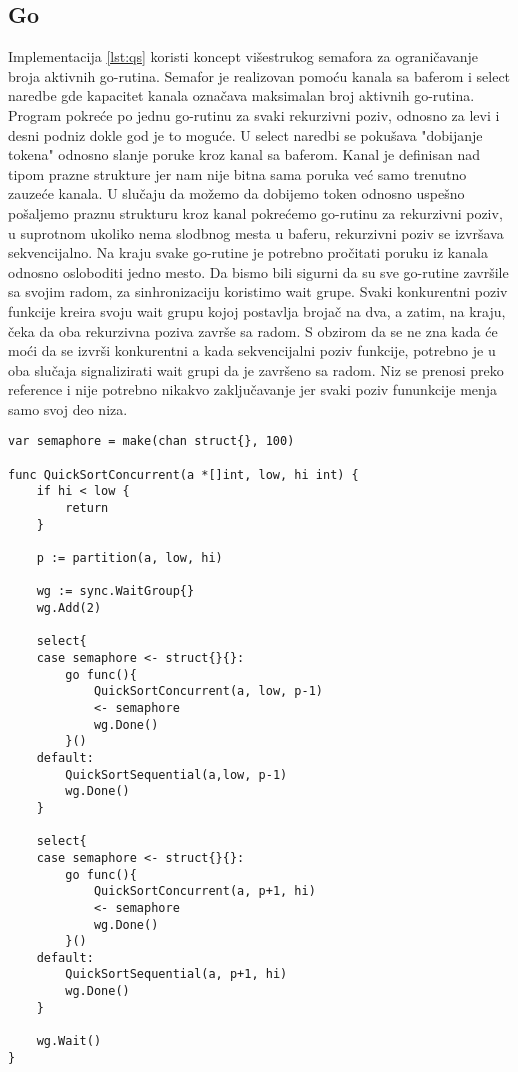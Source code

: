 \documentclass[12pt,oneside]{memoir}
\begin{document}
\subsection{Go}
\label{qs:go}
Implementacija \ref{lst:qs} koristi koncept višestrukog semafora za ograničavanje broja aktivnih go-rutina. Semafor je realizovan pomoću kanala sa baferom i select naredbe gde kapacitet kanala označava maksimalan broj aktivnih go-rutina. Program pokreće po jednu go-rutinu za svaki rekurzivni poziv, odnosno za levi i desni podniz dokle god je to moguće. U select naredbi se pokušava "dobijanje tokena" odnosno slanje poruke kroz kanal sa baferom. Kanal je definisan nad tipom prazne strukture jer nam nije bitna sama poruka već samo trenutno zauzeće kanala. U slučaju da možemo da dobijemo token odnosno uspešno pošaljemo praznu strukturu kroz kanal pokrećemo go-rutinu za rekurzivni poziv, u suprotnom ukoliko nema slodbnog mesta u baferu, rekurzivni poziv se izvršava sekvencijalno. Na kraju svake go-rutine je potrebno pročitati poruku iz kanala odnosno osloboditi jedno mesto. Da bismo bili sigurni da su sve go-rutine završile sa svojim radom, za sinhronizaciju koristimo wait grupe. Svaki konkurentni poziv funkcije kreira svoju wait grupu kojoj postavlja brojač na dva, a zatim, na kraju, čeka da oba rekurzivna poziva završe sa radom. S obzirom da se ne zna kada će moći da se izvrši konkurentni a kada sekvencijalni poziv funkcije, potrebno je u oba slučaja signalizirati wait grupi da je završeno sa radom. Niz se prenosi preko reference i nije potrebno nikakvo zaključavanje jer svaki poziv fununkcije menja samo svoj deo niza.

\begin{center}
\begin{lstlisting}[caption=Go implementacija konkurentne quicksort funkcije,label={lst:qs},float,  backgroundcolor=\color{background}]
var semaphore = make(chan struct{}, 100)

func QuickSortConcurrent(a *[]int, low, hi int) {
	if hi < low {
		return
	}

	p := partition(a, low, hi)

	wg := sync.WaitGroup{}
	wg.Add(2)

	select{
	case semaphore <- struct{}{}:
		go func(){
			QuickSortConcurrent(a, low, p-1)
			<- semaphore
			wg.Done()
		}()
	default:
		QuickSortSequential(a,low, p-1)
		wg.Done()
	}

	select{
	case semaphore <- struct{}{}:
		go func(){
			QuickSortConcurrent(a, p+1, hi)
			<- semaphore
			wg.Done()
		}()
	default:
		QuickSortSequential(a, p+1, hi)
		wg.Done()
	}

	wg.Wait()
}
\end{lstlisting}
\end{center}
\end{document}
